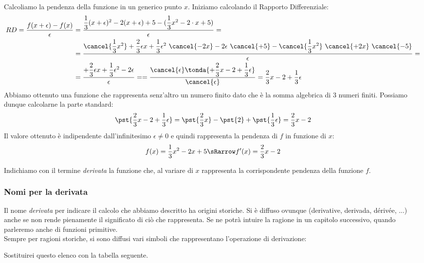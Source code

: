 Calcoliamo la pendenza della funzione in un generico punto \(x\).
Iniziamo calcolando il Rapporto Differenziale:
\begin{align*}RD = \dfrac{f(x + \epsilon) - f(x)}{\epsilon} &=
  \dfrac{\dfrac{1}{3}(x+\epsilon)^2-2(x+\epsilon) + 5 - 
          (\dfrac{1}{3}x^2-2\cdot x+5)}
        {\epsilon} = \\
&= \dfrac{\cancel{\dfrac{1}{3}x^2}+\dfrac{2}{3} \epsilon x 
          +\dfrac{1}{3}\epsilon^2~\cancel{-2x}-2\epsilon~\cancel{+5} - 
          \cancel{\dfrac{1}{3}x^2}~\cancel{+2x}~\cancel{-5}}
         {\epsilon}=\\
&= \dfrac{+\dfrac{2}{3} \epsilon x 
          +\dfrac{1}{3}\epsilon^2-2\epsilon}
         {\epsilon}=
= \dfrac{\cancel{\epsilon} \tonda{+\dfrac{2}{3}x -2+\dfrac{1}{3}\epsilon}}
        {\cancel{\epsilon}}=
\dfrac{2}{3}x-2+\dfrac{1}{3}\epsilon
\end{align*}
Abbiamo ottenuto una funzione che rappresenta senz'altro un numero finito 
dato che è la somma algebrica di 3 numeri finiti.
Possiamo dunque calcolarne la parte standard:
\[\pst{\dfrac{2}{3}x-2+\dfrac{1}{3}\epsilon}=
  \pst{\dfrac{2}{3}x}-\pst{2}+\pst{\dfrac{1}{3}\epsilon}=
  \dfrac{2}{3}x-2\]
Il valore ottenuto è indipendente dall'infinitesimo \(\epsilon \neq 0\) 
e quindi rappresenta la pendenza di \(f\) in funzione di \(x\):
\[f(x) = \dfrac{1}{3}x^2-2x+5 \sRarrow f'(x) = \dfrac{2}{3}x-2\]

\begin{definizione}
Indichiamo con il termine \emph{derivata} la funzione che, al variare di 
\(x\) rappresenta la corrispondente pendenza della funzione \(f\).
\end{definizione}


\subsubsection{Nomi per la derivata}
Il nome \emph{derivata} per indicare il calcolo che abbiamo descritto ha 
origini storiche. Si è diffuso  ovunque (derivative, derivada, dérivée, 
...) anche se non rende pienamente il significato di ciò che rappresenta. 
Se ne potrà intuire la ragione in un capitolo successivo, quando parleremo 
anche di funzioni primitive.\\
Sempre per ragioni storiche, si sono diffusi vari simboli che rappresentano 
l'operazione di derivazione:

Sostituirei questo elenco con la tabella seguente.

